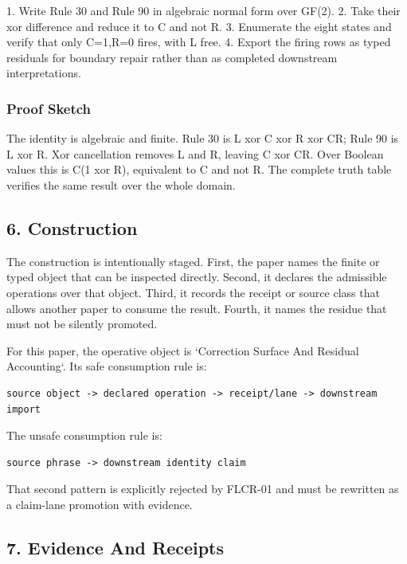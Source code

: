 \documentclass[11pt]{article}
\begin{document}
1. Write Rule 30 and Rule 90 in algebraic normal form over GF(2).
2. Take their xor difference and reduce it to C and not R.
3. Enumerate the eight states and verify that only C=1,R=0 fires, with L free.
4. Export the firing rows as typed residuals for boundary repair rather than as completed downstream interpretations.

\subsubsection*{Proof Sketch}

The identity is algebraic and finite. Rule 30 is L xor C xor R xor CR; Rule 90 is L xor R. Xor cancellation removes L and R, leaving C xor CR. Over Boolean values this is C(1 xor R), equivalent to C and not R. The complete truth table verifies the same result over the whole domain.

\subsection*{6. Construction}

The construction is intentionally staged. First, the paper names the finite or
typed object that can be inspected directly. Second, it declares the admissible
operations over that object. Third, it records the receipt or source class that
allows another paper to consume the result. Fourth, it names the residue that
must not be silently promoted.

For this paper, the operative object is `Correction Surface And Residual Accounting`. Its safe consumption
rule is:

\begin{verbatim}
source object -> declared operation -> receipt/lane -> downstream import
\end{verbatim}

The unsafe consumption rule is:

\begin{verbatim}
source phrase -> downstream identity claim
\end{verbatim}

That second pattern is explicitly rejected by FLCR-01 and must be rewritten as
a claim-lane promotion with evidence.

\subsection*{7. Evidence And Receipts}
\end{document}
